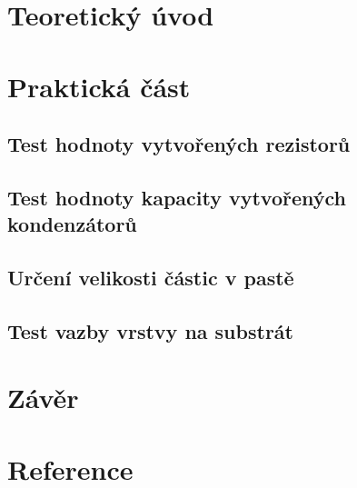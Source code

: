 \documentclass{protokol}
\begin{document}
	\maketitle

\section{Teoretický úvod}
  

\section{Praktická část}
\subsection{Test hodnoty vytvořených rezistorů}
  
  \clearpage
\subsection{Test hodnoty kapacity vytvořených kondenzátorů}
  
\subsection{Určení velikosti částic v pastě}
  
\subsection{Test vazby vrstvy na substrát}
  
  \clearpage

\section{Závěr}
  
  

\section*{Reference}
\printbibliography[heading=none]



% 
\end{document}
